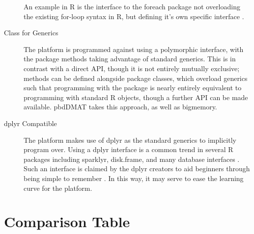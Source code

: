 \documentclass[a4paper,10pt]{article}
\begin{document}
\begin{description}
	      An example in R is the interface to the foreach package not
	      overloading the existing for-loop syntax in R, but defining it's
	      own specific interface \cite{microsoft20}. 
      \item[Class for Generics]
	      The platform is programmed against using a polymorphic interface,
	      with the package methods taking advantage of standard generics.
	      This is in contrast with a direct API, though it is not entirely
	      mutually exclusive;
	      methods can be defined alongside package classes, which overload
	      generics such that programming with the package is nearly
	      entirely equivalent to programming with standard R objects,
	      though a further API can be made available.
	      pbdDMAT takes this approach, as well as
	      bigmemory\cite{pbdDMATpackage}\cite{kane13:bigmemory}.
	\item[dplyr Compatible]
	      The platform makes use of dplyr as the standard generics to
	      implicitly program over.
	      Using a dplyr interface is a common trend in several R packages
	      including sparklyr, disk.frame, and many database interfaces
	      \cite{luraschi20}\cite{zj20}.
	      Such an interface is claimed by the dplyr creators to aid
	      beginners through being simple to remember \cite{wickham2019welcome}.
	      In this way, it may serve to ease the learning curve for the platform.
\end{description}

\section{Comparison Table}\label{sec:comp-tab}
\end{document}
